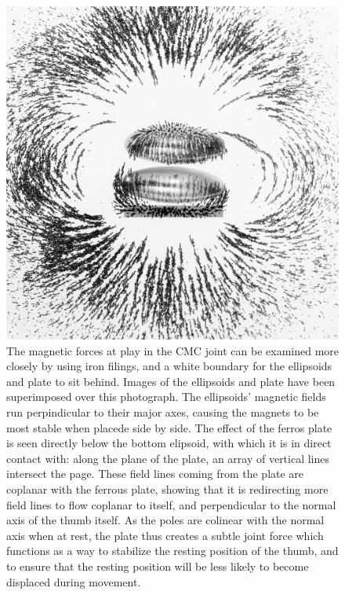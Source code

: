 \documentclass[letterpaper, 10 pt, conference]{ieeeconf}  %
\begin{document}
\begin{figure}
	\centering
	\includegraphics[width = 1\columnwidth]{magnets}
	\caption{The magnetic forces at play in the CMC joint can be examined more closely by using iron filings, and a white boundary for the ellipsoids and plate to sit behind. Images of the ellipsoids and plate have been superimposed over this photograph. The ellipsoids' magnetic fields run perpindicular to their major axes, causing the magnets to be most stable when placede side by side. The effect of the ferros plate is seen directly below the bottom elipsoid, with which it is in direct contact with: along the plane of the plate, an array of vertical lines intersect the page. These field lines coming from the plate are coplanar with the ferrous plate, showing that it is redirecting more field lines to flow coplanar to itself, and perpendicular to the normal axis of the thumb itself. As the poles are colinear with the normal axis when at rest, the plate thus creates a subtle joint force which functions as a way to stabilize the resting position of the thumb, and to ensure that the resting position will be less likely to become displaced during movement.}\label{magnet}
	\vspace{-15pt}
\end{figure}
\end{document}
